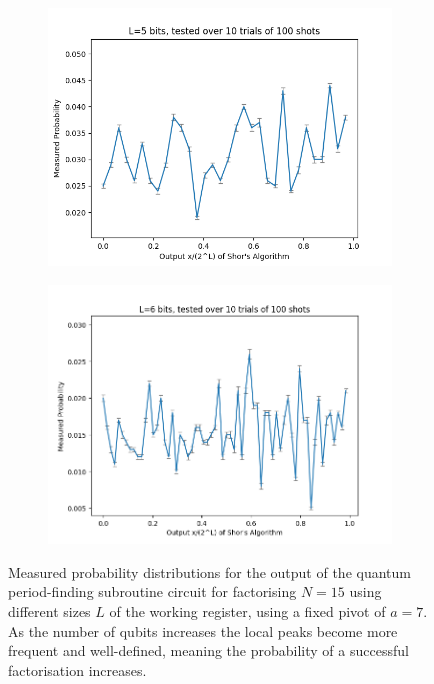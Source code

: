 \documentclass{article}[11pt]
\begin{document}
\begin{figure}[H]
\begin{subfigure}[t]{0.5\textwidth}
\end{subfigure}
\begin{subfigure}[t]{0.5\textwidth}
\centering
\includegraphics[width=\linewidth]{Pictures/Shor Factor 15/shor 5 bits factor 15.png}
\end{subfigure}%
\begin{subfigure}[t]{0.5\textwidth}
\centering
\includegraphics[width=\linewidth]{Pictures/Shor Factor 15/shor 6 bits factor 15.png}
\end{subfigure}
\caption{Measured probability distributions for the output of the quantum period-finding subroutine circuit for factorising $N=15$ using different sizes $L$ of the working register, using a fixed pivot of $a=7$. As the number of qubits increases the local peaks become more frequent and well-defined, meaning the probability of a successful factorisation increases.}
\label{fig:factor15}
\end{figure}
\end{document}
